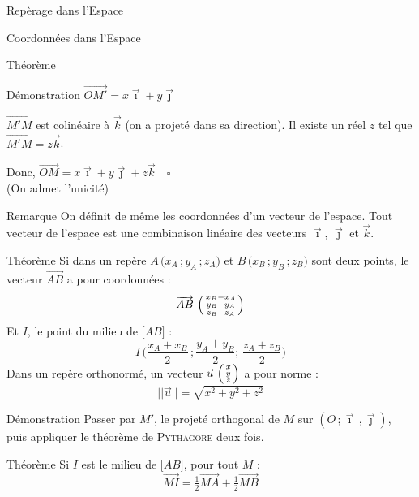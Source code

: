 \documentclass{cours}
\begin{document}
\begin{Gpartie}{Repèrage dans l'Espace}
\begin{Spartie}{Coordonnées dans l'Espace}
\begin{SSpartie}{Théorème}
\begin{SSSpartie}{Démonstration}
                    $\overrightarrow{OM'}=x\vec{\imath}+y\vec{\jmath}$

                    $\overrightarrow{M'M}$ est colinéaire à $\vec{k}$ (on a projeté dans sa direction). Il existe un réel $z$ tel que $\overrightarrow{M'M}=z\vec{k}$.

                    Donc, $\overrightarrow{OM}=x\vec{\imath}+y\vec{\jmath}+z\vec{k}\quad\square$ \\
                    (On admet l'unicité)
                \end{SSSpartie}
                \begin{SSSpartie}{Remarque} 
                    On définit de même les coordonnées d'un vecteur de l'espace. Tout vecteur de l'espace est une combinaison linéaire des vecteurs $\vec{\imath}$, $\vec{\jmath}$ et $\vec{k}$.
                \end{SSSpartie}
            \end{SSpartie}
            \begin{SSpartie}{Théorème} 
                Si dans un repère $A\,\big(x_A\,; y_A\,; z_A\big)$ et $B\,\big(x_B\,; y_B\,; z_B\big)$ sont deux points, le vecteur $\overrightarrow{AB}$ a pour coordonnées : 
                \[\overrightarrow{AB}~\begin{psmallmatrix} x_B-x_A \\ y_B-y_A \\ z_B-z_A \end{psmallmatrix}\]
                Et $I$, le point du milieu de $\big[AB\big]$ :
                \[I\,\Bigg(\frac{x_A+x_B}{2}\,;\frac{y_A+y_B}{2};\,\frac{z_A+z_B}{2}\Bigg)\]
                Dans un repère orthonormé, un vecteur $\vec{u}~\begin{psmallmatrix}x \\ y \\ z\end{psmallmatrix}$ a pour norme :
                \[\lvert\lvert\vec{u}\rvert\rvert=\sqrt{x^2+y^2+z^2}\]
                \begin{SSSpartie}{Démonstration} 
                    Passer par $M'$, le projeté orthogonal de $M$ sur $\left(O\,;\vec{\imath}\,,\vec{\jmath}\right)$, puis appliquer le théorème de \textsc{Pythagore} deux fois.
                \end{SSSpartie}
            \end{SSpartie}
            \begin{SSpartie}{Théorème} 
                Si $I$ est le milieu de $\big[AB\big]$, pour tout $M$ :
                \[\overrightarrow{MI}=\tfrac{1}{2}\overrightarrow{MA}+\tfrac{1}{2}\overrightarrow{MB}\]

\end{SSpartie}
\end{Spartie}
\end{Gpartie}
\end{document}
